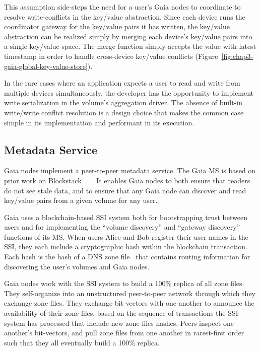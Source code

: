 This assumption side-steps the need for a user's Gaia nodes to
coordinate to resolve write-conflicts in the key/value abstraction.  Since each
device runs the coordinator gateway for the key/value pairs it has
written, the key/value abstraction can be realized simply by
merging each device's key/value pairs into a single key/value space.
The merge function simply accepts the
value with latest timestamp in order to handle cross-device
key/value conflicts (Figure~\ref{fig:chap3-gaia-global-key-value-store}).

In the rare cases where an application expects a user to read and write from
multiple devices simultaneously, the developer has the opportunity to implement
write serialization in the volume's aggregation driver.  The absence of built-in
write/write conflict resolution is a design choice that makes the common case
simple in its implementation and performant in its execution. 

\subsection{Metadata Service}

Gaia nodes implement a peer-to-peer metadata service.  The Gaia MS is based on prior work
on Blockstack~\cite{blockstack}~\cite{virtualchain}~\cite{ali2017}.  It enables
Gaia nodes to both ensure that readers do not see stale data, and to ensure that
any Gaia node can discover and read key/value pairs from a given volume for any user.

Gaia uses a blockchain-based SSI system both for bootstrapping trust between
users and for implementing the ``volume discovery'' and ``gateway discovery''
functions of its MS.  When users Alice and Bob 
register their user names in the SSI, they each include a cryptographic hash within the
blockchain transaction.  Each hash is the hash of a DNS zone
file~\cite{rfc-zone-file} that contains routing information for discovering the
user's volumes and Gaia nodes.

Gaia nodes work with the SSI system to build a 100\% replica of all zone files.
They self-organize into an unstructured
peer-to-peer network through which they exchange zone files.  They exchange
bit-vectors with one another to announce the availability of their zone files,
based on the sequence of transactions the SSI system has processed that include
new zone files hashes.  Peers inspect one another's bit-vectors, and pull
zone files from one another in rarest-first order such that they all eventually
build a 100\% replica.


